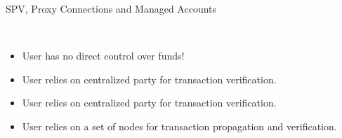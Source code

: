 \documentclass[handout]{beamer}
\begin{document}
\begin{frame}{SPV, Proxy Connections and Managed Accounts}

 \\ \vspace{1em}

	
	\begin{itemize}
		\item<2-> User has no direct control over funds!
		\item<2-> User relies on centralized party for transaction verification.
	\end{itemize}

	\vspace{1em}	
		
		
		\begin{itemize}
		\item<3-> User relies on centralized party for transaction verification.
	\end{itemize}		
	
	\vspace{1em}
	
	
	\begin{itemize}
		\item<4-> User relies on a set of nodes for transaction propagation and verification.

	\end{itemize}
	

	
\end{frame}
\end{document}
